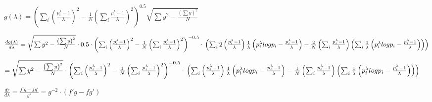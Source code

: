 \begin{math}
g(\lambda)=
\left(\sum_i\left(\frac{p_i^{\lambda}-1}{\lambda}\right)^2-\frac{1}{N}\left(\sum_i \frac{p_i^{\lambda}-1}{\lambda}\right)^2  \right)^{0.5}
\sqrt{\sum{y^2}-\frac{\left(\sum{y}\right)^2}{N}}
\end{math}

\begin{math}
\frac{dg(\lambda)}{d\lambda}=
\sqrt{\sum{y^2}-\frac{\left(\sum{y}\right)^2}{N}}\cdot
0.5\cdot\left(\sum_i\left(\frac{p_i^{\lambda}-1}{\lambda}\right)^2-\frac{1}{N}\left(\sum_i \frac{p_i^{\lambda}-1}{\lambda}\right)^2  \right)^{-0.5}
\cdot\\
\left(
\sum_i2\left(\frac{p_i^{\lambda}-1}{\lambda} \right)\frac{1}{\lambda}\left(p_i^{\lambda}log{p_i}-\frac{p_i^{\lambda}-1}{\lambda}\right)
-\frac{2}{N}\left(\sum_i \frac{p_i^{\lambda}-1}{\lambda}\right) \left(\sum_i \frac{1}{\lambda}\left(p_i^{\lambda}log{p_i}-\frac{p_i^{\lambda}-1}{\lambda}\right) \right)
\right)
\end{math}

\begin{math}
=
\sqrt{\sum{y^2}-\frac{\left(\sum{y}\right)^2}{N}}\cdot
\left(\sum_i\left(\frac{p_i^{\lambda}-1}{\lambda}\right)^2-\frac{1}{N}\left(\sum_i \frac{p_i^{\lambda}-1}{\lambda}\right)^2  \right)^{-0.5}
\cdot\\
\left(
\sum_i\left(\frac{p_i^{\lambda}-1}{\lambda} \right)\frac{1}{\lambda}\left(p_i^{\lambda}log{p_i}-\frac{p_i^{\lambda}-1}{\lambda}\right)
-\frac{1}{N}\left(\sum_i \frac{p_i^{\lambda}-1}{\lambda}\right) \left(\sum_i \frac{1}{\lambda}\left(p_i^{\lambda}log{p_i}-\frac{p_i^{\lambda}-1}{\lambda}\right) \right)
\right)
\end{math}

\begin{math}
\frac{dr}{d\lambda}=\frac{f'g-fg'}{g^2}=g^{-2}\cdot\left(f'g-fg'\right)
\end{math}

